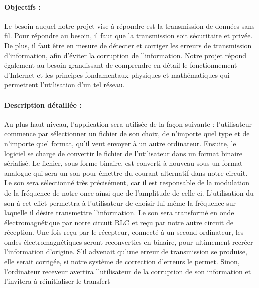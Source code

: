 \paragraph{Objectifs :}
Le besoin auquel notre projet vise à répondre est la transmission de données sans fil.
Pour répondre au besoin, il faut que la transmission soit sécuritaire et privée.
De plus, il faut être en mesure de détecter et corriger les erreurs de transmission d'information, afin d'éviter la corruption de l'information.
Notre projet répond également au besoin grandissant de comprendre en détail le fonctionnement d'Internet et les principes fondamentaux physiques et mathématiques qui permettent l'utilisation d'un tel réseau.

\paragraph{Description détaillée :}
Au plus haut niveau, l'application sera utilisée de la façon suivante : l'utilisateur commence par sélectionner un fichier de son choix, de n'importe quel type et de n'importe quel format, qu'il veut envoyer à un autre ordinateur. Ensuite, le logiciel se charge de convertir le fichier de l'utilisateur dans un format binaire sérialisé. Le fichier, sous forme binaire, est converti à nouveau sous un format analogue qui sera un son pour émettre du courant alternatif dans notre circuit. Le son sera sélectionné très précisément, car il est responsable de la modulation de la fréquence de notre once ainsi que de l'amplitude de celle-ci. L'utilisation du son à cet effet permettra à l'utilisateur de choisir lui-même la fréquence sur laquelle il désire transmettre l'information. Le son sera transformé en onde électromagnétique par notre circuit RLC et reçu par notre autre circuit de réception. Une fois reçu par le récepteur, connecté à un second ordinateur, les ondes électromagnétiques seront reconverties en binaire, pour ultimement recréer l'information d'origine. S'il advenait qu'une erreur de transmission se produise, elle serait corrigée, si notre système de correction d'erreurs le permet. Sinon, l'ordinateur receveur avertira l'utilisateur de la corruption de son information et l'invitera à réinitialiser le transfert

